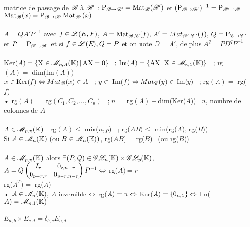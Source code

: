 \documentclass[12 pt]{exampleclass}
\begin{document}
\begin{flushleft}
\begin{doublespace}
	
	\text{ }\\
	\underline{matrice de passage de $\mathscr{B}$ à $\mathscr{B}'$ :} $\text{P}_{\mathscr{B} \rightarrow \mathscr{B}'} = \text{Mat}_{\mathscr{B}}(\mathscr{B}')$ et $(\text{P}_{\mathscr{B} \rightarrow \mathscr{B}'})^{- 1} = \text{P}_{\mathscr{B} ' \rightarrow \mathscr{B}}$\\ 
	$\text{Mat}_{\mathscr{B}}(x) =  \text{P}_{\mathscr{B} \rightarrow \mathscr{B}'} \, \text{Mat}_{\mathscr{B} '}(x)$\\

	\text{ }\\
	$ A = Q A' P^{- 1}$ avec $f\in\mathscr{L}(E,F)$, $A = \text{Mat}_{\mathscr{B},\mathscr{C}}(f), \, A' = Mat_{\mathscr{B}',\mathscr{C} '}(f), \, Q =  \text{P}_{\mathscr{C} \rightarrow \mathscr{C} '}$ et $ P =  \text{P}_{\mathscr{B} \rightarrow \mathscr{B}'}$ et si $f\in\mathscr{L}(E), Q = P$ et on note $D = A'$, de plus $A^q = PD^q P^{- 1}$\\

	\text{ }\\
	Ker$(A) = \{ \text{X}\in \mathscr{M}_{n,A}(\mathbb{K}) \, | \, \text{AX} = 0\}$ \ ; Im$(A) = \{ \text{AX} \, |\, \text{X}\in\mathscr{M}_{n,1}(\mathbb{K})\}$ \ ; rg$(A) =$ dim(Im$(A))$\\
	$x\in \text{Ker}(f) \Leftrightarrow Mat_{\mathscr{B}}(x)\in A$ \ ; $y\in $ Im($f) \Leftrightarrow Mat_{\mathscr{C}} (y)\in $ Im($y)$ \ ; rg$(A) =$ rg($f$)\\
	• rg$(A) =$ rg$(C_1,C_2, \dots,C_n)$ \ ; $n =$ rg$(A) + $dim(Ker($A$)) \ $n$, nombre de colonnes de $A$\\

	\text{ }\\
	$A\in\mathscr{M}_{p,n}(\mathbb{K})$ : rg$(A) \leq$ min($n,p$) \ ; rg($AB) \leq$ min(rg($A$), rg($B$))\\
	Si $A\in\mathscr{M}_n(\mathbb{K})$ (ou $B\in \mathscr{M}_n(\mathbb{K}))$, rg($AB$) = rg($B$) \ (ou rg($B$))\\
	
	\text{ }\\
	$A\in\mathscr{M}_{p,n}(\mathbb{K})$ alors $\exists (P,Q)\in \mathscr{G}\mathscr{L}_n(\mathbb{K})\times\mathscr{G}\mathscr{L}_p(\mathbb{K})$, $A = Q \begin{pmatrix} I_r & 0_{r, n-r} \\ 0_{p - r, r} & 0_{p - r, n - r}\end{pmatrix} P^{- 1} \Leftrightarrow$ rg($A) = r$\\
	rg($A^T) =$ rg($A$)\\
	• $A\in \mathscr{M}_n(\mathbb{K})$, $A$ inversible $\Leftrightarrow$ rg($A) = n \Leftrightarrow$ Ker($A) = \{ 0_{n,1} \} \Leftrightarrow$ Im($A) = \mathscr{M}_{n,1}(\mathbb{K})$\\
	\text{ }\\
	$E_{a,b} \times E_{c,d} = \delta_{b,c} E_{a,d}$\\

\end{doublespace}
\end{flushleft}
\newpage
\end{document}
